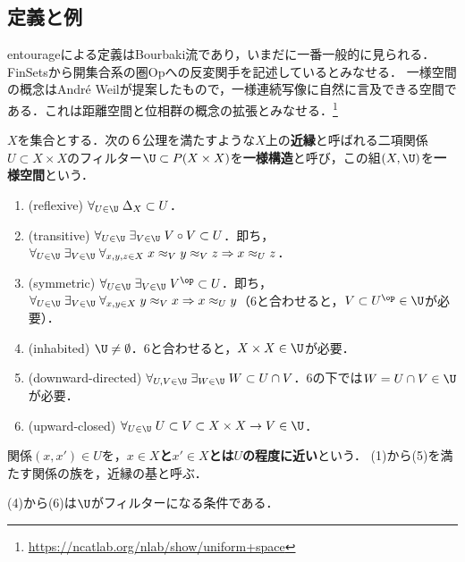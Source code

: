 \documentclass[uplatex,dvipdfmx]{jsreport}
\begin{document}
\subsection{定義と例}

\begin{tcolorbox}[colframe=ForestGreen, colback=ForestGreen!10!white,breakable,colbacktitle=ForestGreen!40!white,coltitle=black,fonttitle=\bfseries\sffamily,
title=]
    entourageによる定義はBourbaki流であり，いまだに一番一般的に見られる．FinSetsから開集合系の圏Opへの反変関手を記述しているとみなせる．
    一様空間の概念はAndré Weilが提案したもので，一様連続写像に自然に言及できる空間である．これは距離空間と位相群の概念の拡張とみなせる．\footnote{\url{https://ncatlab.org/nlab/show/uniform+space}}
\end{tcolorbox}

\begin{definition}
    $X$を集合とする．次の６公理を満たすような$X$上の\textbf{近縁}と呼ばれる二項関係$U\subset X\times X$のフィルター$\U\subset P(X\times X)$を\textbf{一様構造}と呼び，この組$(X,\U)$を\textbf{一様空間}という．
    \begin{enumerate}
        \item (reflexive) $\forall_{U\in\U}\;\Delta_X\subset U$．
        \item (transitive) $\forall_{U\in\U}\;\exists_{V\in\U}\;V\circ V\subset U$．即ち，$\forall_{U\in\U}\;\exists_{V\in\U}\;\forall_{x,y,z\in X}\;x\approx_V y\approx_V z\Rightarrow x\approx_U z$．
        \item (symmetric) $\forall_{U\in\U}\;\exists_{V\in\U}\;V^\op\subset U$．即ち，$\forall_{U\in\U}\;\exists_{V\in\U}\;\forall_{x,y\in X}\;y\approx_V x\Rightarrow x\approx_Uy$（6と合わせると，$V\subset U^\op\in\U$が必要）．
        \item (inhabited) $\U\ne\emptyset$．6と合わせると，$X\times X\in\U$が必要．
        \item (downward-directed) $\forall_{U,V\in\U}\;\exists_{W\in\U}\;W\subset U\cap V$．6の下では$W=U\cap V\in\U$が必要．
        \item (upward-closed) $\forall_{U\in\U}\;U\subset V\subset X\times X\rightarrow V\in\U$．
    \end{enumerate}
    関係$(x,x')\in U$を，\textbf{$x\in X$と$x'\in X$とは$U$の程度に近い}という．
    (1)から(5)を満たす関係の族を，近縁の基と呼ぶ．
\end{definition}
\begin{remarks}
    (4)から(6)は$\U$がフィルターになる条件である．
\end{remarks}
\end{document}
